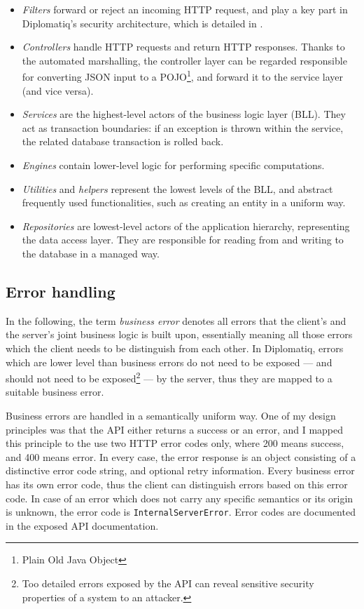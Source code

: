 \begin{itemize}
\item \emph{Filters} forward or reject an incoming HTTP request, and play a key part in Diplomatiq's security architecture, which is detailed in .
\item \emph{Controllers} handle HTTP requests and return HTTP responses. Thanks to the automated marshalling, the controller layer can be regarded responsible for converting JSON input to a POJO\footnote{Plain Old Java Object}, and forward it to the service layer (and vice versa).
\item \emph{Services} are the highest-level actors of the business logic layer (BLL). They act as transaction boundaries: if an exception is thrown within the service, the related database transaction is rolled back.
\item \emph{Engines} contain lower-level logic for performing specific computations.
\item \emph{Utilities} and \emph{helpers} represent the lowest levels of the BLL, and abstract frequently used functionalities, such as creating an entity in a uniform way.
\item \emph{Repositories} are lowest-level actors of the application hierarchy, representing the data access layer. They are responsible for reading from and writing to the database in a managed way.
\end{itemize}

\subsection{Error handling}

In the following, the term \emph{business error} denotes all errors that the client's and the server's joint business logic is built upon, essentially meaning all those errors which the client needs to be distinguish from each other. In Diplomatiq, errors which are lower level than business errors do not need to be exposed — and should not need to be exposed\footnote{Too detailed errors exposed by the API can reveal sensitive security properties of a system to an attacker.} — by the server, thus they are mapped to a suitable business error.

Business errors are handled in a semantically uniform way. One of my design principles was that the API either returns a success or an error, and I mapped this principle to the use two HTTP error codes only, where 200 means success, and 400 means error. In every case, the error response is an object consisting of a distinctive error code string, and optional retry information. Every business error has its own error code, thus the client can distinguish errors based on this error code. In case of an error which does not carry any specific semantics or its origin is unknown, the error code is \lstinline{InternalServerError}. Error codes are documented in the exposed API documentation.

